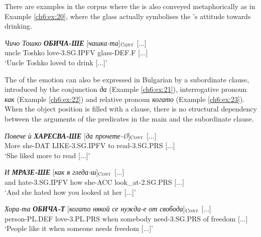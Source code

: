 \documentclass[output=paper,colorlinks,citecolor=brown]{langscibook}
\begin{document}
There are examples in the corpus where the  is also conveyed metaphorically as in Example \ref{ch6:ex:20}, where the glass actually symbolises the ’s attitude towards drinking.


\begin{exe} 
\ex  \label{ch6:ex:20} 
\gll \textit{Чичо Тошко} {\textit{\textbf{ОБИЧА-ШЕ}}} [\textit{чашка-та}]$_{\text{\textsc{Cont}}}$ [...] \\ 
{uncle Toshko} {love-3.SG.IPFV} {glass-DEF.F}  [...]
\\ %
\glt `Uncle Toshko loved to drink [...]'
\end{exe}

The  of the emotion can also be expressed in Bulgarian by a subordinate clause, introduced by the conjunction \textit{да} (Example \ref{ch6:ex:21}), interrogative pronoun \textit{как} (Example \ref{ch6:ex:22}) and relative pronoun \textit{когато} (Example \ref{ch6:ex:23}). When the object position is filled with a clause, there is no structural dependency between the arguments of the predicates in the main and the subordinate clause. 

\begin{exe} 
\ex  \label{ch6:ex:21} 
\gll \textit{Повече} \textit{ѝ} \textit{\textbf{ХАРЕСВА-ШЕ}} [\textit{да прочете-Ø}]$_{\text{\textsc{Cont}}}$ [...] \\ 
{More} {she-DAT} {LIKE-3.SG.IPFV} {to read-3.SG.PRS} [...]
\\ %
\glt `She liked more to read [...]'

\ex   \label{ch6:ex:22} 
\gll  \textit{И} \textit{\textbf{МРАЗЕ-ШЕ}} [\textit{как} \textit{я}
\textit{гледа-ш}]$_{\text{\textsc{Cont}}}$ [...] \\ 
{and}  {hate-3.SG.IPFV} {how} {she-ACC} {look\_at}-2.SG.PRS [...]
\\  %
\glt `And she hated how you looked at her [...]'
 
\ex   \label{ch6:ex:23} 
\gll  \textit{Хора-та} \textit{\textbf{ОБИЧА-Т}} [\textit{когато} \textit{някой} \textit{се нужда-е} \textit{от} \textit{свобода}]$_{\text{\textsc{Cont}}}$ [...] \\ 
{person-PL.DEF} {love-3.PL.PRS} when somebody need-3.SG.PRS of freedom  [...]
\\ %
\glt `People like it when someone needs freedom [...]'
\end{exe} 
\end{document}
